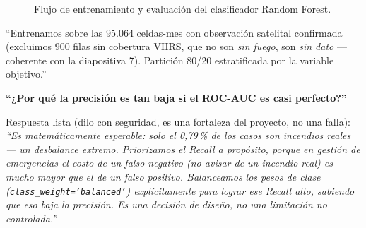 \documentclass[11pt,a4paper]{article}
\begin{document}
\begin{figure}[H]
\centering
{}
\caption{Flujo de entrenamiento y evaluaci\'on del clasificador Random Forest.}
\end{figure}

\begin{decirbox}
``Entrenamos sobre las 95.064 celdas-mes con observaci\'on satelital confirmada (excluimos 900 filas sin cobertura VIIRS, que no son \emph{sin fuego}, son \emph{sin dato} --- coherente con la diapositiva 7). Partici\'on 80/20 estratificada por la variable objetivo.''
\end{decirbox}

\begin{alertabox}[title={Anticipa esta pregunta t\'u mismo, antes de que te la hagan}]
\textbf{``¿Por qu\'e la precisi\'on es tan baja si el ROC-AUC es casi perfecto?''}

Respuesta lista (dilo con seguridad, es una fortaleza del proyecto, no una falla): \emph{``Es matem\'aticamente esperable: solo el 0,79\,\% de los casos son incendios reales --- un desbalance extremo. Priorizamos el Recall a prop\'osito, porque en gesti\'on de emergencias el costo de un falso negativo (no avisar de un incendio real) es mucho mayor que el de un falso positivo. Balanceamos los pesos de clase (\texttt{class\_weight='balanced'}) expl\'icitamente para lograr ese Recall alto, sabiendo que eso baja la precisi\'on. Es una decisi\'on de dise\~no, no una limitaci\'on no controlada.''}
\end{alertabox}
\end{document}
